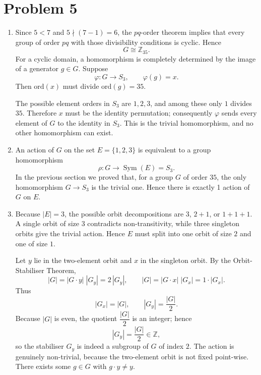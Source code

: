 \documentclass[12pt]{article}
\begin{document}
\section*{Problem 5}
\begin{enumerate}[label=(\arabic*)] 

\item
Since \(5<7\) and \(5\nmid(7-1)=6\), the $pq$-order theorem implies that every group of order \(pq\) with those divisibility conditions is cyclic.  Hence
\[
G \cong \mathbb Z_{35}.
\]
For a cyclic domain, a homomorphism is completely determined by the image of a generator \(g\in G\).  Suppose
\[
\varphi : G \longrightarrow S_{3},\qquad \varphi(g)=x.
\]
Then \(\mathrm{ord}(x)\) must divide \(\mathrm{ord}(g)=35\).

The possible element orders in \(S_{3}\) are \(1,2,3\), and among these only \(1\) divides \(35\).  Therefore \(x\) must be the identity permutation; consequently \(\varphi\) sends every element of \(G\) to the identity in \(S_{3}\).  This is the trivial homomorphism, and no other homomorphism can exist.

\item

An action of \(G\) on the set \(E=\{1,2,3\}\) is equivalent to a group homomorphism
\[
\rho : G \longrightarrow \operatorname{Sym}(E)=S_{3}.
\]
In the previous section we proved that, for a group \(G\) of order \(35\), the only homomorphism \(G\to S_{3}\) is the trivial one. Hence there is exactly 1 action of \(G\) on \(E\).

\item
Because \(|E| = 3\), the possible orbit decompositions are
\(3\), \(2+1\), or \(1+1+1\).
A single orbit of size \(3\) contradicts non-transitivity, while
three singleton orbits give the trivial action.
Hence \(E\) must split into one orbit of size \(2\) and one of size \(1\).

Let \(y\) lie in the two-element orbit and \(x\) in the singleton orbit.
By the Orbit-Stabiliser Theorem,
\[
|G| = |G\!\cdot\!y|\;|G_{y}| = 2\,|G_{y}|,\qquad
|G| = |G\!\cdot\!x|\;|G_{x}| = 1\cdot |G_{x}|.
\]
Thus
\[
|G_{x}| = |G|,\qquad |G_{y}| = \frac{|G|}{2}.
\]
Because \(|G|\) is even, the quotient \(\dfrac{|G|}{2}\) is an integer; hence 
\[
|G_{y}|=\frac{|G|}{2}\in\mathbb{Z},
\]
so the stabiliser \(G_{y}\) is indeed a subgroup of \(G\) of index \(2\).
The action is genuinely non-trivial, because the two-element orbit is not fixed point-wise. There exists some \(g\in G\) with \(g\!\cdot\!y \neq y\).


\end{enumerate}
\end{document}
